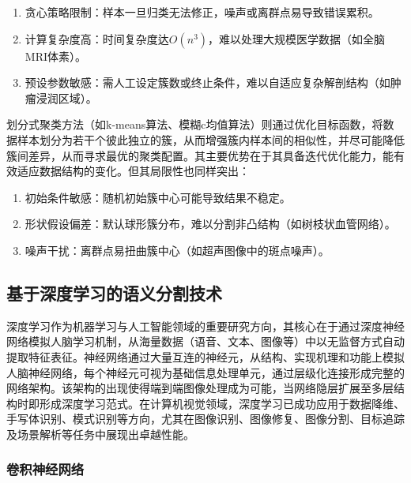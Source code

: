 \begin{enumerate}
    \item 贪心策略限制：样本一旦归类无法修正，噪声或离群点易导致错误累积。
    \item 计算复杂度高：时间复杂度达$O(n^3)$，难以处理大规模医学数据（如全脑MRI体素）。
    \item 预设参数敏感：需人工设定簇数或终止条件，难以自适应复杂解剖结构（如肿瘤浸润区域）。
\end{enumerate}

划分式聚类方法（如k-means算法、模糊c均值算法）则通过优化目标函数，将数据样本划分为若干个彼此独立的簇，从而增强簇内样本间的相似性，并尽可能降低簇间差异，从而寻求最优的聚类配置。其主要优势在于其具备迭代优化能力，能有效适应数据结构的变化。但其局限性也同样突出：

\begin{enumerate}
    \item 初始条件敏感：随机初始簇中心可能导致结果不稳定。
    \item 形状假设偏差：默认球形簇分布，难以分割非凸结构（如树枝状血管网络）。
    \item 噪声干扰：离群点易扭曲簇中心（如超声图像中的斑点噪声）。
\end{enumerate}

\subsection{基于深度学习的语义分割技术}

深度学习作为机器学习与人工智能领域的重要研究方向，其核心在于通过深度神经网络模拟人脑学习机制，从海量数据（语音、文本、图像等）中以无监督方式自动提取特征表征。神经网络通过大量互连的神经元，从结构、实现机理和功能上模拟人脑神经网络，每个神经元可视为基础信息处理单元，通过层级化连接形成完整的网络架构\cite{qiu2020nndl}。该架构的出现使得端到端图像处理成为可能，当网络隐层扩展至多层结构时即形成深度学习范式。在计算机视觉领域，深度学习已成功应用于数据降维、手写体识别、模式识别等方向，尤其在图像识别、图像修复、图像分割、目标追踪及场景解析等任务中展现出卓越性能。

\subsubsection{卷积神经网络}


